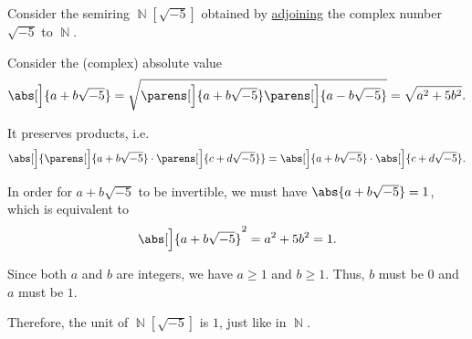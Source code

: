 \begin{example}
\begin{thmenum}
     Consider the semiring \( \BbbN[\sqrt{-5}] \) obtained by \hyperref[def:semiring_adjunction]{adjoining} the complex number \( \sqrt{-5} \) to \( \BbbN \).

    Consider the (complex) absolute value
    \begin{equation*}
      \abs[\Big]{a + b \sqrt{-5}}
      =
      \sqrt{\parens[\Big]{ a + b \sqrt{-5} }\parens[\Big]{ a - b \sqrt{-5}}}
      =
      \sqrt{a^2 + 5b^2}.
    \end{equation*}

    It preserves products, i.e.
    \begin{equation*}
      \abs[\Big]{\parens[\Big]{a + b \sqrt{-5}} \cdot \parens[\Big]{c + d \sqrt{-5}}}
      =
      \abs[\Big]{a + b \sqrt{-5}} \cdot \abs[\Big]{c + d \sqrt{-5}}.
    \end{equation*}

    In order for \( a + b\sqrt{-5} \) to be invertible, we must have \( \abs{a + b\sqrt{-5}} = 1 \), which is equivalent to
    \begin{equation*}
      \abs[\Big]{a + b\sqrt{-5}}^2 = a^2 + 5b^2 = 1.
    \end{equation*}

    Since both \( a \) and \( b \) are integers, we have \( a \geq 1 \) and \( b \geq 1 \). Thus, \( b \) must be \( 0 \) and \( a \) must be \( 1 \).

    Therefore, the unit of \( \BbbN[\sqrt{-5}] \) is \( 1 \), just like in \( \BbbN \).
  \end{thmenum}
\end{example}

